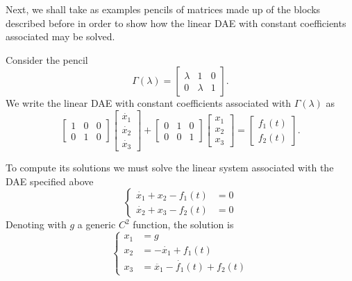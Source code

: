 Next, we shall take as examples pencils of matrices made up of the blocks described before in order to show how the
linear DAE with constant coefficients associated may be solved.
\pagebreak
\begin{example} \label{exmp:dae-l2}
    Consider the pencil
    \[
        \Gamma(\lambda) =
        \begin{bmatrix}
            \lambda & 1 & 0 \\
            0 & \lambda & 1
        \end{bmatrix}.
    \]
    We write the linear DAE with constant coefficients associated with \(\Gamma(\lambda)\) as
    \[
        \begin{bmatrix}
            1 & 0 & 0 \\
            0 & 1 & 0
        \end{bmatrix}
        \begin{bmatrix}
            \dot{x_{1}} \\
            \dot{x_{2}} \\
            \dot{x_{3}}
        \end{bmatrix}
        + \begin{bmatrix}
            0 & 1 & 0 \\
            0 & 0 & 1
        \end{bmatrix}
        \begin{bmatrix}
            x_{1} \\
            x_{2} \\
            x_{3}
        \end{bmatrix} =
        \begin{bmatrix}
            f_{1}(t) \\
            f_{2}(t)
        \end{bmatrix}.
    \]

    To compute its solutions we must solve the linear system associated with the DAE specified above
    \begin{equation}
        \left\{
        \begin{aligned}
            \dot{x_{1}} + x_{2} - f_{1}(t) & = 0 \\
            \dot{x_{2}} + x_{3} - f_{2}(t) & = 0
        \end{aligned}
        \right.
    \end{equation}
    Denoting with \(g\) a generic \(C^2\) function, the solution is
    \begin{equation*}
        \left\{
            \begin{aligned}
                x_{1} &= g \\
                x_{2} &= -\dot{x_{1}} + f_{1}(t) \\
                x_{3} &= \ddot{x_{1}} - \dot{f_{1}}(t) + f_{2}(t)
            \end{aligned}
        \right.
    \end{equation*}
\end{example}
